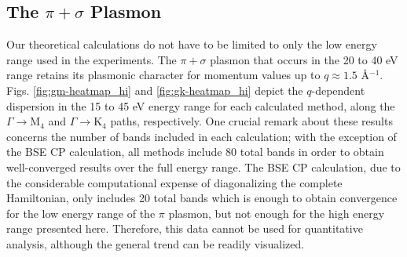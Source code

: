 \documentclass[aps,prb,10pt,showpacs,superscriptaddress,twocolumn,notitlepage]{revtex4-1}
\begin{document}

\subsection{The \texorpdfstring{$\pi + \sigma$}{pi + sigma} Plasmon}

Our theoretical calculations do not have to be limited to only the low energy
range used in the experiments. The $\pi + \sigma$ plasmon that occurs in the 20
to 40 eV range retains its plasmonic character for momentum values up to $q
\approx 1.5$ \r{A}$^{-1}$. Figs. \ref{fig:gm-heatmap_hi} and
\ref{fig:gk-heatmap_hi} depict the $q$-dependent dispersion in the 15 to 45 eV
energy range for each calculated method, along the $\Gamma \rightarrow
\mathrm{M}_{4}$ and $\Gamma \rightarrow \mathrm{K}_{4}$ paths, respectively. One
crucial remark about these results concerns the number of bands included in each
calculation; with the exception of the BSE CP calculation, all methods include
80 total bands in order to obtain well-converged results over the full energy
range. The BSE CP calculation, due to the considerable computational expense of
diagonalizing the complete Hamiltonian, only includes 20 total bands which is
enough to obtain convergence for the low energy range of the $\pi$ plasmon, but
not enough for the high energy range presented here. Therefore, this data cannot
be used for quantitative analysis, although the general trend can be readily
visualized.
\end{document}
